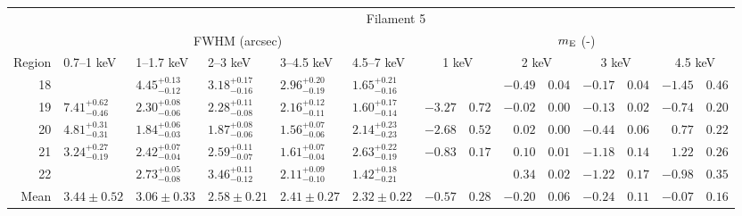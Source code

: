 \begin{tabular}{@{}rlllllr@{ $\pm$ }lr@{ $\pm$ }lr@{ $\pm$ }lr@{ $\pm$ }l@{}}
\midrule
{} & \multicolumn{13}{c}{Filament 5} \\
\cmidrule(l){2-14}
{} & \multicolumn{5}{c}{FWHM (arcsec)} & \multicolumn{8}{c}{$m_\mathrm{E}$ (-)} \\
\cmidrule(lr){2-6} \cmidrule(l){7-14}
Region & 0.7--1 keV & 1--1.7 keV & 2--3 keV & 3--4.5 keV & 4.5--7 keV
       & \multicolumn{2}{c}{1 keV} & \multicolumn{2}{c}{2 keV}
       & \multicolumn{2}{c}{3 keV} & \multicolumn{2}{c}{4.5 keV} \\
\cmidrule{1-14}
18 & {} & ${4.45}^{+0.13}_{-0.12}$ & ${3.18}^{+0.17}_{-0.16}$ & ${2.96}^{+0.20}_{-0.19}$ & ${1.65}^{+0.21}_{-0.16}$
  & \multicolumn{2}{c}{} & $-0.49$ & $0.04$ & $-0.17$ & $0.04$ & $-1.45$ & $0.46$ \\
19 & ${7.41}^{+0.62}_{-0.46}$ & ${2.30}^{+0.08}_{-0.06}$ & ${2.28}^{+0.11}_{-0.08}$ & ${2.16}^{+0.12}_{-0.11}$ & ${1.60}^{+0.17}_{-0.14}$
  & $-3.27$ & $0.72$ & $-0.02$ & $0.00$ & $-0.13$ & $0.02$ & $-0.74$ & $0.20$ \\
20 & ${4.81}^{+0.31}_{-0.31}$ & ${1.84}^{+0.06}_{-0.03}$ & ${1.87}^{+0.08}_{-0.06}$ & ${1.56}^{+0.07}_{-0.06}$ & ${2.14}^{+0.23}_{-0.23}$
  & $-2.68$ & $0.52$ & $0.02$ & $0.00$ & $-0.44$ & $0.06$ & $0.77$ & $0.22$ \\
21 & ${3.24}^{+0.27}_{-0.19}$ & ${2.42}^{+0.07}_{-0.04}$ & ${2.59}^{+0.11}_{-0.07}$ & ${1.61}^{+0.07}_{-0.04}$ & ${2.63}^{+0.22}_{-0.19}$
  & $-0.83$ & $0.17$ & $0.10$ & $0.01$ & $-1.18$ & $0.14$ & $1.22$ & $0.26$ \\
22 & {} & ${2.73}^{+0.05}_{-0.08}$ & ${3.46}^{+0.11}_{-0.12}$ & ${2.11}^{+0.09}_{-0.10}$ & ${1.42}^{+0.18}_{-0.21}$
  & \multicolumn{2}{c}{} & $0.34$ & $0.02$ & $-1.22$ & $0.17$ & $-0.98$ & $0.35$ \\
\midrule
Mean & $3.44 \pm 0.52$ & $3.06 \pm 0.33$ & $2.58 \pm 0.21$ & $2.41 \pm 0.27$ & $2.32 \pm 0.22$
  & $-0.57$ & $0.28$ & $-0.20$ & $0.06$ & $-0.24$ & $0.11$ & $-0.07$ & $0.16$ \\
\bottomrule
\end{tabular}
